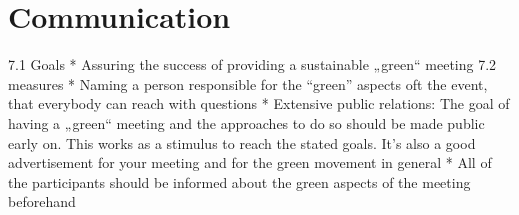 \section{Communication}
7.1 Goals
*	Assuring the success of providing a sustainable „green“ meeting
7.2 measures
*	Naming a person responsible for the “green” aspects oft the event, that everybody can reach with questions
*	Extensive public relations: The goal of having a „green“ meeting and the approaches to do so should be made public early on. This works as a stimulus to reach the stated goals. It's also a good advertisement for your meeting and for the green movement in general
*	All of the participants should be informed about the green aspects of the meeting beforehand 





